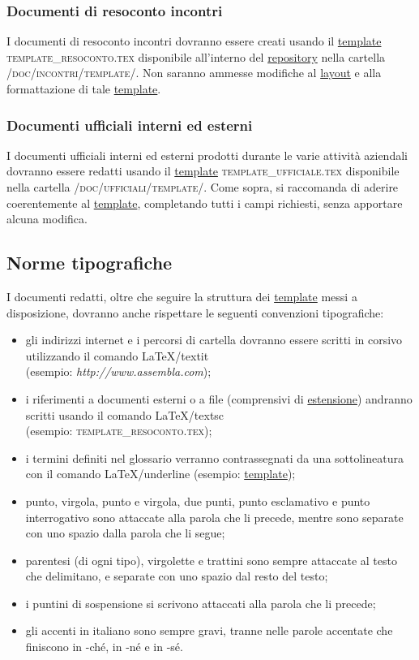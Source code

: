 \documentclass[11pt,a4paper]{article}
\begin{document}
\subsubsection{Documenti di resoconto incontri}
I documenti di resoconto incontri dovranno essere creati usando il \underline{template} \textsc{template\_resoconto.tex} disponibile all'interno del \underline{repository} nella car\-tella \textsc{/doc/incontri/template/}. Non saranno ammesse modifiche al \underline{layout} e alla formattazione di tale \underline{template}.
\subsubsection{Documenti ufficiali interni ed esterni}
I documenti ufficiali interni ed esterni prodotti durante le varie attività aziendali dovranno essere redatti usando il \underline{template} \textsc{template\_ufficiale.tex} disponibile nella cartella \textsc{/doc/ufficiali/template/}.
Come sopra, si raccomanda di aderire coerentemente al \underline{template}, completando tutti i campi richiesti, senza apportare alcuna modifica.
\subsection{Norme tipografiche}
I documenti redatti, oltre che seguire la struttura  dei \underline{template} messi a disposizione, dovranno anche rispettare le seguenti convenzioni tipografiche:
\begin{itemize}
	\item gli indirizzi internet e i percorsi di cartella dovranno essere scritti in corsivo utilizzando il comando \LaTeX \space /textit 
\\ (esempio: \textit{http://www.assembla.com});
	\item i riferimenti a documenti esterni o a file (comprensivi di \underline{estensione}) andranno scritti usando il comando \LaTeX \space /textsc 
\\ (esempio: \textsc{template\_resoconto.tex});
	\item i termini definiti nel glossario verranno contrassegnati da una sottolineatura con il comando \LaTeX \space /underline (esempio: \underline{template});
	\item punto, virgola, punto e virgola, due punti, punto esclamativo e punto interrogativo sono attaccate alla parola che li precede, mentre sono separate con uno spazio dalla parola che li segue;
	\item parentesi (di ogni tipo), virgolette e trattini sono sempre attaccate al testo che delimitano, e separate con uno spazio dal resto del testo;
	\item i puntini di sospensione si scrivono attaccati alla parola che li precede;
	\item gli accenti in italiano sono sempre gravi, tranne nelle parole accentate che finiscono in -ché, in -né e in -sé.
\end{itemize}
\end{document}
